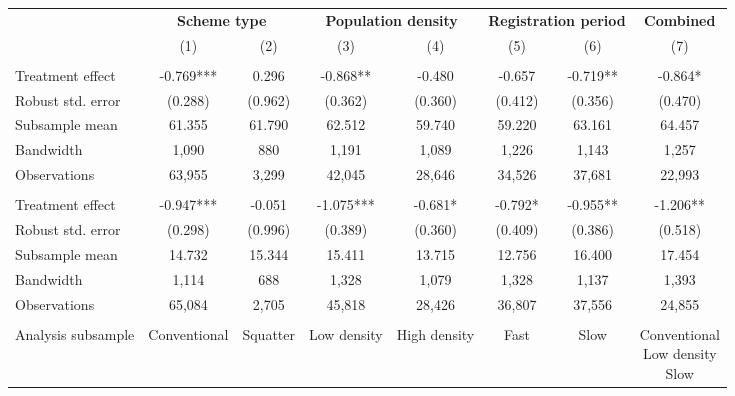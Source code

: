 
\begin{tabular}{lccccccc}
\toprule
\multicolumn{1}{c}{\textbf{ }} & \multicolumn{2}{c}{\textbf{Scheme type}} & \multicolumn{2}{c}{\textbf{Population density}} & \multicolumn{2}{c}{\textbf{Registration period}} & \multicolumn{1}{c}{\textbf{Combined}} \\
\cmidrule(l{3pt}r{3pt}){2-3} \cmidrule(l{3pt}r{3pt}){4-5} \cmidrule(l{3pt}r{3pt}){6-7} \cmidrule(l{3pt}r{3pt}){8-8}
  & (1) & (2) & (3) & (4) & (5) & (6) & (7)\\
\midrule
\addlinespace[0.3em]
\multicolumn{8}{l}{\textit{\textbf{Panel A: NDVI}}}\\
\hspace{1em}Treatment effect & -0.769*** & 0.296 & -0.868** & -0.480 & -0.657 & -0.719** & -0.864*\\
\hspace{1em}Robust std. error & (0.288) & (0.962) & (0.362) & (0.360) & (0.412) & (0.356) & (0.470)\\
\hspace{1em}Subsample mean & 61.355 & 61.790 & 62.512 & 59.740 & 59.220 & 63.161 & 64.457\\
\hspace{1em}Bandwidth & 1,090 & 880 & 1,191 & 1,089 & 1,226 & 1,143 & 1,257\\
\hspace{1em}Observations & 63,955 & 3,299 & 42,045 & 28,646 & 34,526 & 37,681 & 22,993\\
\addlinespace[0.3em]
\multicolumn{8}{l}{\textit{\textbf{Panel B: NDMI}}}\\
\hspace{1em}Treatment effect & -0.947*** & -0.051 & -1.075*** & -0.681* & -0.792* & -0.955** & -1.206**\\
\hspace{1em}Robust std. error & (0.298) & (0.996) & (0.389) & (0.360) & (0.409) & (0.386) & (0.518)\\
\hspace{1em}Subsample mean & 14.732 & 15.344 & 15.411 & 13.715 & 12.756 & 16.400 & 17.454\\
\hspace{1em}Bandwidth & 1,114 & 688 & 1,328 & 1,079 & 1,328 & 1,137 & 1,393\\
\hspace{1em}Observations & 65,084 & 2,705 & 45,818 & 28,426 & 36,807 & 37,556 & 24,855\\
\addlinespace[0.3em]
\multicolumn{8}{l}{\textbf{Model specifications}}\\
\hspace{1em}Analysis subsample & Conventional & Squatter & Low density & High density & Fast & Slow & \makecell[c]{Conventional\\Low density\\Slow}\\
\bottomrule
\end{tabular}